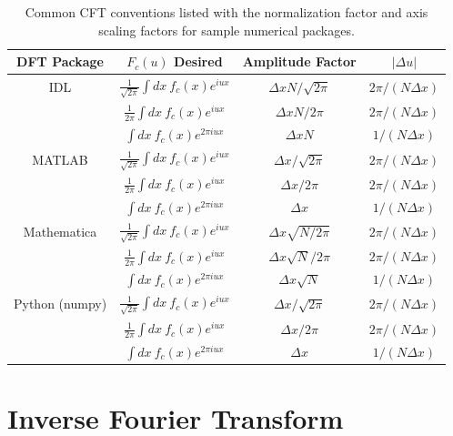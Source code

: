 \documentclass{article}
\newcommand\T{\rule{0pt}{2.6ex}}
\newcommand\B{\rule[-1.2ex]{0pt}{0pt}}
\begin{document}
\begin{table}
\begin{center}
\begin{tabular}{c c c c}
\hline
DFT Package	\T \B	&	$F_c(u)$ Desired																	&	Amplitude Factor					&	$\left|\Delta u\right|$		\\ \hline
IDL		\T \B				&	$\frac{1}{\sqrt{2\pi}}\int dx \ f_c(x) e^{i u x}$	&	$\Delta x N/\sqrt{2\pi}$	&	$2\pi/(N\Delta x)$ 				\\
			\T \B				&	$\frac{1}{2\pi}\int dx \ f_c(x) e^{i u x}$				&	$\Delta x N/2\pi$					&	$2\pi/(N\Delta x)$				\\
			\T \B				&	$\int dx \ f_c(x) e^{2\pi i u x}$									&	$\Delta x N$							&	$1/(N\Delta x)$						\\ \hline
MATLAB	\T \B			&	$\frac{1}{\sqrt{2\pi}}\int dx \ f_c(x) e^{i u x}$	&	$\Delta x/\sqrt{2\pi}$		&	$2\pi/(N\Delta x)$			 	\\
				\T \B			&	$\frac{1}{2\pi}\int dx \ f_c(x) e^{i u x}$				&	$\Delta x/2\pi$						&	$2\pi/(N\Delta x)$				\\
				\T \B			&	$\int dx \ f_c(x) e^{2\pi i u x}$									&	$\Delta x$								&	$1/(N\Delta x)$						\\ \hline
Mathematica	\T \B	&	$\frac{1}{\sqrt{2\pi}}\int dx \ f_c(x) e^{i u x}$	&	$\Delta x\sqrt{N/2\pi}$		&	$2\pi/(N\Delta x)$ 				\\
				\T \B			&	$\frac{1}{2\pi}\int dx \ f_c(x) e^{i u x}$				&	$\Delta x\sqrt{N}/2\pi$		&	$2\pi/(N\Delta x)$				\\
				\T \B			&	$\int dx \ f_c(x) e^{2\pi i u x}$									&	$\Delta x\sqrt{N}$				&	$1/(N\Delta x)$						\\ \hline
Python (numpy)	\T \B			&	$\frac{1}{\sqrt{2\pi}}\int dx \ f_c(x) e^{i u x}$	&	$\Delta x/\sqrt{2\pi}$		&	$2\pi/(N\Delta x)$			 	\\
				\T \B			&	$\frac{1}{2\pi}\int dx \ f_c(x) e^{i u x}$				&	$\Delta x/2\pi$						&	$2\pi/(N\Delta x)$				\\
				\T \B			&	$\int dx \ f_c(x) e^{2\pi i u x}$									&	$\Delta x$								&	$1/(N\Delta x)$						\\ \hline
\end{tabular}
\caption{Common CFT conventions listed with the normalization factor and axis scaling factors for sample numerical packages.}
\label{table:applied_examples}
\end{center}
\end{table}

\section{Inverse Fourier Transform}
\end{document}
